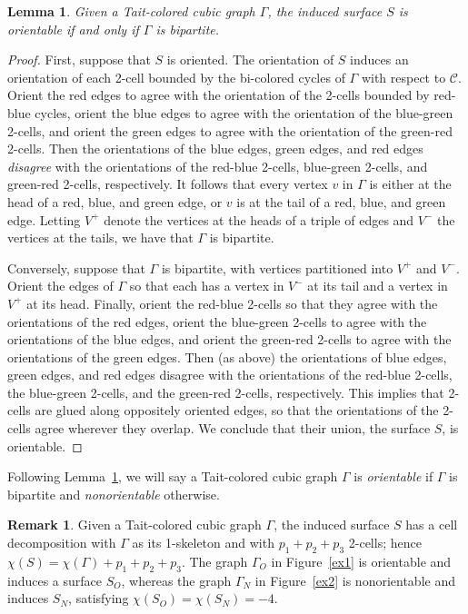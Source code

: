 \documentclass[11pt, oneside]{amsart}
\theoremstyle{theorem}
\newtheorem{lemma}[theorem]{Lemma}
\theoremstyle{definition}
\newtheorem{remark}[theorem]{Remark}
\theoremstyle{theorem}
\begin{document}
\begin{lemma}\label{orient}
Given a Tait-colored cubic graph $\Gamma$, the induced surface $S$ is orientable if and only if $\Gamma$ is bipartite.
\end{lemma}

\begin{proof}
First, suppose that $S$ is oriented.  The orientation of $S$ induces an orientation of each 2-cell bounded by the bi-colored cycles of $\Gamma$ with respect to $\mathcal{C}$.  Orient the red edges to agree with the orientation of the 2-cells bounded by red-blue cycles, orient the blue edges to agree with the orientation of the blue-green 2-cells, and orient the green edges to agree with the orientation of the green-red 2-cells.  Then the orientations of the blue edges, green edges, and red edges \emph{disagree} with the orientations of the red-blue 2-cells, blue-green 2-cells, and green-red 2-cells, respectively.  It follows that every vertex $v$ in $\Gamma$ is either at the head of a red, blue, and green edge, or $v$ is at the tail of a red, blue, and green edge.  Letting $V^+$ denote the vertices at the heads of a triple of edges and $V^-$ the vertices at the tails, we have that $\Gamma$ is bipartite.

Conversely, suppose that $\Gamma$ is bipartite, with vertices partitioned into $V^+$ and $V^-$.  Orient the edges of $\Gamma$ so that each has a vertex in $V^-$ at its tail and a vertex in $V^+$ at its head.  Finally, orient the red-blue 2-cells so that they agree with the orientations of the red edges, orient the blue-green 2-cells to agree with the orientations of the blue edges, and orient the green-red 2-cells to agree with the orientations of the green edges.  Then (as above) the orientations of blue edges, green edges, and red edges disagree with the orientations of the red-blue 2-cells, the blue-green 2-cells, and the green-red 2-cells, respectively.  This implies that 2-cells are glued along oppositely oriented edges, so that the orientations of the 2-cells agree wherever they overlap.  We conclude that their union, the surface $S$, is orientable.
\end{proof}

Following Lemma~\ref{orient}, we will say a Tait-colored cubic graph $\Gamma$ is \emph{orientable} if $\Gamma$ is bipartite and \emph{nonorientable} otherwise. 

\begin{remark}
Given a Tait-colored cubic graph $\Gamma$, the induced surface $S$ has a cell decomposition with $\Gamma$ as its 1-skeleton and with $p_1 + p_2 + p_3$ 2-cells; hence $\chi(S) = \chi(\Gamma) + p_1 + p_2 + p_3$.  The graph $\Gamma_O$ in Figure~\ref{ex1} is orientable and induces a surface $S_O$, whereas the graph $\Gamma_N$ in Figure~\ref{ex2} is nonorientable and induces $S_N$, satisfying $\chi(S_O) = \chi(S_N) = -4$.
\end{remark}
\end{document}
